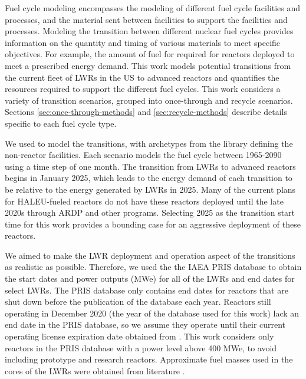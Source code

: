 Fuel cycle modeling encompasses the modeling of different 
fuel cycle facilities and processes, and the material 
sent between facilities to support the facilities and processes. 
Modeling the transition between different nuclear fuel cycles provides 
information on the quantity and timing of various materials to meet 
specific objectives. For example, the 
amount of fuel for required for reactors deployed to meet a 
prescribed energy demand. 
This work models potential transitions from the 
current fleet of \glspl{LWR} in the US to advanced reactors and 
quantifies the 
resources required to support the different fuel cycles. 
This work considers a variety of transition scenarios, grouped 
into once-through and recycle scenarios. Sections \ref{sec:once-through-methods}
and \ref{sec:recycle-methods} describe details specific to each 
fuel cycle type.

We used \Cyclus \cite{huff_fundamental_2016} to model the transitions, 
with archetypes from the \Cycamore library \cite{carlsen_cycamore_2014}
defining the non-reactor facilities. Each scenario models the fuel 
cycle between 1965-2090 using a time step of one month. 
The transition from \glspl{LWR} 
to advanced reactors begins in January 2025, which leads to 
the energy demand of each transition to be relative to the energy generated by 
\glspl{LWR} in 2025.  Many of the 
current plans for \gls{HALEU}-fueled reactors do not have these reactors 
deployed until the late 2020s \cite{nichol_current_2021} through \gls{ARDP} 
and other programs. Selecting 2025 as the transition 
start time for this work provides a bounding case for 
an aggressive deployment of these reactors. 

We aimed to make the \gls{LWR} deployment and operation 
aspect of the transitions as realistic as possible. Therefore, 
we used the the \gls{IAEA} \gls{PRIS} 
database \cite{noauthor_power_1989} to obtain the start dates and 
power outputs (MWe) for all of the \glspl{LWR} and end 
dates for select \glspl{LWR}. The \gls{PRIS} database only contains end dates 
for reactors that are shut down before the publication of the 
database each year. Reactors still operating in December 2020  
(the year of the database used for this work) lack an end date 
in the \gls{PRIS} database, so we assume they operate until 
their current operating license expiration date obtained from  
\cite{nuclear_energy_institute_us_2021}. This work considers only 
reactors in the \gls{PRIS} database with a power level above 400 MWe, 
to avoid including prototype and research reactors. 
Approximate fuel masses used in the cores of the \glspl{LWR} were obtained 
from literature \cite{todreas_nuclear_2012,cacuci_handbook_2010}. 

